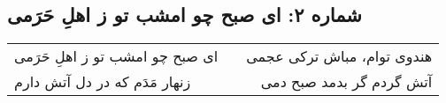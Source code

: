 \begin{center}
\section*{شماره ۲: ای صبح چو امشب تو ز اهلِ حَرَمی}
\label{sec:002}
\begin{longtable}{l p{0.5cm} r}
ای صبح چو امشب تو ز اهلِ حَرَمی
&&
هندوی توام، مباش ترکی عجمی
\\
زنهار مَدَم که در دل آتش دارم
&&
آتش گردم گر بدمد صبح دمی
\\
\end{longtable}
\end{center}
